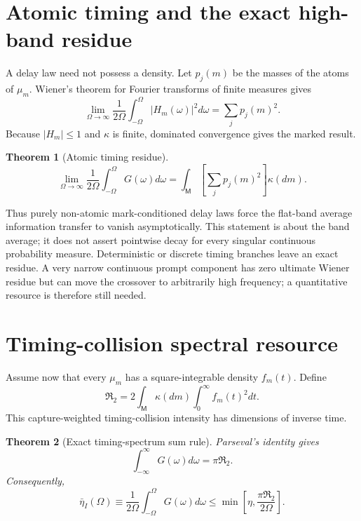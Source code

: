 \documentclass[aps,prapplied,preprint,nofootinbib]{revtex4-2}
\newtheorem{theorem}{Theorem}
\newcommand{\Rtwo}{\mathfrak R_2}
\newcommand{\M}{\mathsf M}
\begin{document}
\section{Atomic timing and the exact high-band residue}

A delay law need not possess a density. Let $p_j(m)$ be the masses of the atoms of $\mu_m$. Wiener's theorem for Fourier transforms of finite measures \cite{Katznelson2004} gives
\begin{equation}
\lim_{\Omega\to\infty}\frac{1}{2\Omega}
\int_{-\Omega}^{\Omega}|H_m(\omega)|^2d\omega
=\sum_jp_j(m)^2.
\end{equation}
Because $|H_m|\le1$ and $\kappa$ is finite, dominated convergence gives the marked result.

\begin{theorem}[Atomic timing residue]
\begin{equation}
\boxed{
\lim_{\Omega\to\infty}\frac{1}{2\Omega}
\int_{-\Omega}^{\Omega}G(\omega)d\omega
=\int_{\M}\left[\sum_jp_j(m)^2\right]\kappa(dm).}
\label{eq:atomic}
\end{equation}
\end{theorem}

Thus purely non-atomic mark-conditioned delay laws force the flat-band average information transfer to vanish asymptotically. This statement is about the band average; it does not assert pointwise decay for every singular continuous probability measure. Deterministic or discrete timing branches leave an exact residue. A very narrow continuous prompt component has zero ultimate Wiener residue but can move the crossover to arbitrarily high frequency; a quantitative resource is therefore still needed.

\section{Timing-collision spectral resource}

Assume now that every $\mu_m$ has a square-integrable density $f_m(t)$. Define
\begin{equation}
\boxed{
\Rtwo=2\int_{\M}\kappa(dm)\int_0^\infty f_m(t)^2dt.}
\label{eq:R2}
\end{equation}
This capture-weighted timing-collision intensity has dimensions of inverse time.

\begin{theorem}[Exact timing-spectrum sum rule]
Parseval's identity gives
\begin{equation}
\boxed{
\int_{-\infty}^{\infty}G(\omega)d\omega=\pi\Rtwo.}
\label{eq:parseval}
\end{equation}
Consequently,
\begin{equation}
\boxed{
\bar\eta_I(\Omega)
\equiv\frac{1}{2\Omega}\int_{-\Omega}^{\Omega}G(\omega)d\omega
\le\min\left[\eta,\frac{\pi\Rtwo}{2\Omega}\right].}
\label{eq:flat}
\end{equation}
\end{theorem}
\end{document}
